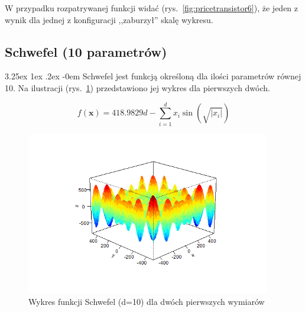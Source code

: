 \documentclass[11pt, a4paper]{article}
\makeatletter
\newcommand{\fbi}{\leavevmode{\parindent=1em\indent}}
\renewcommand\paragraph{\@startsection{paragraph}{5}{\z@}
  {3.25ex \@plus1ex \@minus.2ex}
  {-0em}
  {\normalfont\normalsize\bfseries}}
\makeatother
\begin{document}
\fbi
W przypadku rozpatrywanej funkcji widać (rys.~\ref{fig:pricetransistor6}), że jeden z wynik dla jednej z konfiguracji ,,zaburzył'' skalę wykresu.

\newpage
\subsection{Schwefel (10 parametrów)}
\paragraph{}
Schwefel jest funkcją określoną dla ilości parametrów równej 10. Na ilustracji (rys.~\ref{fig:schwefel1}) przedstawiono jej wykres dla pierwszych dwóch.

\begin{equation}\label{eq:schwefel}
f(\boldsymbol{x}) = 418.9829d - \sum_{i=1}^{d} x_i \sin(\sqrt{|x_i|})
\end{equation}

\begin{figure}[H]
	\begin{center}
		\includegraphics[width=0.95\textwidth]{./assets/Schwefel1.png}
		\caption{Wykres funkcji Schwefel (d=10) dla dwóch pierwszych wymiarów}
		\label{fig:schwefel1}
	\end{center}
\end{figure}
\end{document}
